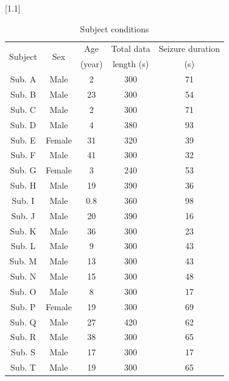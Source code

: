 \documentclass[journal]{IEEEtran}
\begin{document}
\begin{table}[!t]
 \begin{center}
 \caption[Subject conditions]{\small Subject conditions}
 \label{table:conditions}
 \vspace{-2.5mm}
 \scalebox{1.1}[1.1]{%
  \begin{tabular}{ccccc}
   \toprule %
   \multirow{2}{*}{Subject} &  \multirow{2}{*}{Sex} &  Age  & Total data & Seizure duration \\
   & & (year) &  length (s) & (s) \\
   \midrule %
   Sub. A & Male & 2 & 300 & 71\\ %
   Sub. B & Male & 23 & 300 & 54\\ %
   Sub. C & Male & 2 & 300 & 71\\ %
   Sub. D & Male & 4 & 380 & 93\\ %
   Sub. E & Female & 31 & 320  & 39\\ %
   Sub. F & Male & 41 & 300 & 32\\%
   Sub. G & Female & 3 & 240 & 53\\%
   Sub. H & Male & 19 & 390 & 36\\ %
   Sub. I & Male & 0.8 & 360  & 98\\ %
   Sub. J & Male & 20 & 390 & 16\\ %
   Sub. K & Male & 36 & 300 & 23\\ %
   Sub. L & Male & 9 & 300 & 43\\ %
   Sub. M & Male & 13 & 300  & 43\\ %
   Sub. N & Male & 15 & 300 & 48\\%
   Sub. O & Male & 8 & 300 & 17\\ %
   Sub. P & Female & 19 & 300 & 69\\ %
   Sub. Q & Male & 27 & 420 & 62\\ %
	 Sub. R & Male & 38 & 300 & 65\\ %
	 Sub. S & Male & 17 & 300 & 17\\ %
	 Sub. T & Male & 19 & 300 & 65\\ %
   \bottomrule %
  \end{tabular}
  }
 \end{center}
\end{table}
\end{document}
